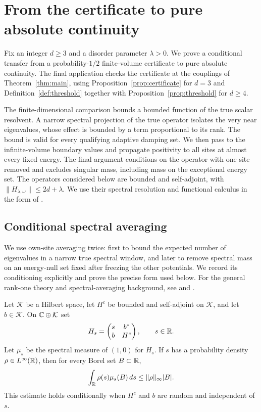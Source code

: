 \section{From the certificate to pure absolute continuity}
\label{sec:spectral}

Fix an integer $d\ge3$ and a disorder parameter $\lambda>0$.
We prove a conditional transfer from a probability-$1/2$
finite-volume certificate to pure absolute continuity. The final
application checks the certificate at the couplings of
Theorem~\ref{thm:main}, using Proposition~\ref{prop:certificate} for
$d=3$ and Definition~\ref{def:threshold} together with
Proposition~\ref{prop:threshold} for $d\ge4$.

The finite-dimensional comparison bounds a bounded function of the
true scalar resolvent. A narrow spectral projection of the true
operator isolates the very near eigenvalues, whose effect is bounded
by a term proportional to its rank. The bound is valid for every
qualifying adaptive damping set. We then
pass to the infinite-volume boundary values and propagate positivity
to all sites at almost every fixed energy. The final argument
conditions on the operator with one site removed and excludes singular
mass, including mass on the exceptional energy set.
The operators considered below are bounded and self-adjoint, with
$\|H_{\lambda,\omega}\|\le2d+\lambda$. We use their spectral
resolution and functional calculus in the form of
\cite[Theorem~3.7]{Teschl2009}.

\subsection{Conditional spectral averaging}

We use own-site averaging twice: first to bound the expected number of
eigenvalues in a narrow true spectral window, and later to remove
spectral mass on an energy-null set fixed after freezing the other
potentials. We record its conditioning explicitly and prove the
precise form used below. For the general
rank-one theory and spectral-averaging background, see
\cite[Theorem~5 and Section~7]{SimonWolff1986} and
\cite[Theorem~1.1 and Proposition~3.1]{Marx2011}.

\begin{lemma}\label{lem:spectral-averaging}
Let $\mathcal K$ be a Hilbert space, let $H^c$ be bounded and
self-adjoint on $\mathcal K$, and let $b\in\mathcal K$. On
$\mathbb C\oplus\mathcal K$ set
\[
 H_s=\begin{pmatrix}s&b^*\\b&H^c\end{pmatrix},\qquad s\in\mathbb R.
\]
Let $\mu_s$ be the spectral measure of $(1,0)$ for $H_s$.
If $s$ has a probability density $\rho\in L^\infty(\mathbb R)$, then
for every Borel set $B\subset\mathbb R$,
\begin{equation}\label{eq:spectral-averaging-bound}
 \int_{\mathbb R}\rho(s)\mu_s(B)\,ds
 \le \|\rho\|_\infty |B|.
\end{equation}
This estimate holds conditionally when $H^c$ and $b$ are random and
independent of $s$.
\end{lemma}

